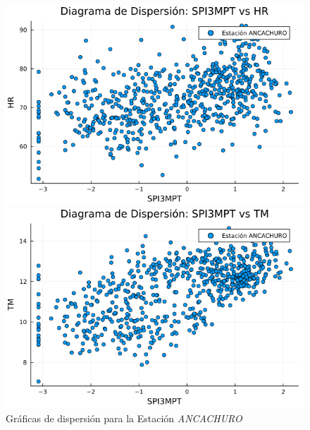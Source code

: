 \begin{figure}[htbp]
\centering
\caption{Gráficas de dispersión para la Estación \textit{ANCACHURO}}
\begin{minipage}{0.32\textwidth}
    \centering
    \includegraphics[width=\linewidth]{Capitulos/Scaterplot/ANCACHURO_SPI3MPT_vs_HR.png}
\end{minipage}\hfill
\begin{minipage}{0.32\textwidth}
    \centering
    \includegraphics[width=\linewidth]{Capitulos/Scaterplot/ANCACHURO_SPI3MPT_vs_TM.png}
\end{minipage}\hfill
\begin{minipage}{0.32\textwidth}
    \centering

\end{minipage}
\end{figure}
